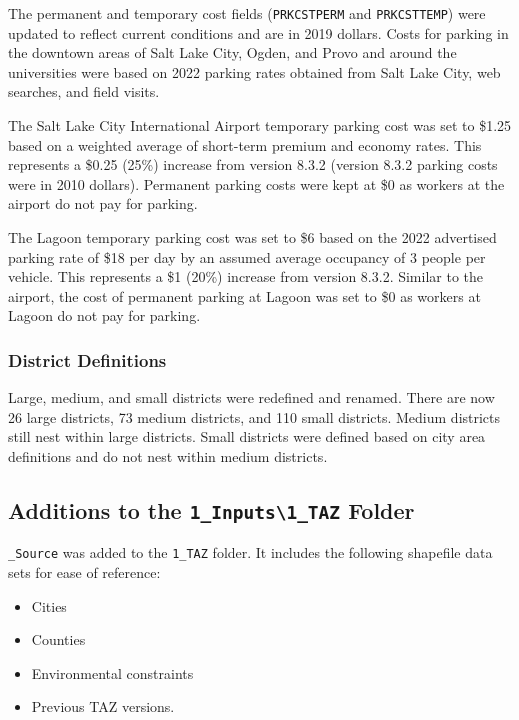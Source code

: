 \documentclass[
  letterpaper,
  DIV=11,
  numbers=noendperiod]{scrreprt}
\providecommand{\tightlist}{%
  \setlength{\itemsep}{0pt}\setlength{\parskip}{0pt}}\usepackage{longtable,booktabs,array}
\begin{document}
The permanent and temporary cost fields (\texttt{PRKCSTPERM} and
\texttt{PRKCSTTEMP}) were updated to reflect current conditions and are
in 2019 dollars. Costs for parking in the downtown areas of Salt Lake
City, Ogden, and Provo and around the universities were based on 2022
parking rates obtained from Salt Lake City, web searches, and field
visits.

The Salt Lake City International Airport temporary parking cost was set
to \$1.25 based on a weighted average of short-term premium and economy
rates. This represents a \$0.25 (25\%) increase from version 8.3.2
(version 8.3.2 parking costs were in 2010 dollars). Permanent parking
costs were kept at \$0 as workers at the airport do not pay for parking.

The Lagoon temporary parking cost was set to \$6 based on the 2022
advertised parking rate of \$18 per day by an assumed average occupancy
of 3 people per vehicle. This represents a \$1 (20\%) increase from
version 8.3.2. Similar to the airport, the cost of permanent parking at
Lagoon was set to \$0 as workers at Lagoon do not pay for parking.

\hypertarget{district-definitions}{%
\subsubsection{District Definitions}\label{district-definitions}}

Large, medium, and small districts were redefined and renamed. There are
now 26 large districts, 73 medium districts, and 110 small districts.
Medium districts still nest within large districts. Small districts were
defined based on city area definitions and do not nest within medium
districts.

\hypertarget{additions-to-the-1_inputs1_taz-folder}{%
\subsection{\texorpdfstring{Additions to the
\texttt{1\_Inputs\textbackslash{}1\_TAZ}
Folder}{Additions to the 1\_Inputs\textbackslash1\_TAZ Folder}}\label{additions-to-the-1_inputs1_taz-folder}}

\texttt{\_Source} was added to the \texttt{1\_TAZ} folder. It includes
the following shapefile data sets for ease of reference:

\begin{itemize}
\tightlist
\item
  Cities
\item
  Counties
\item
  Environmental constraints
\item
  Previous TAZ versions.
\end{itemize}
\end{document}
